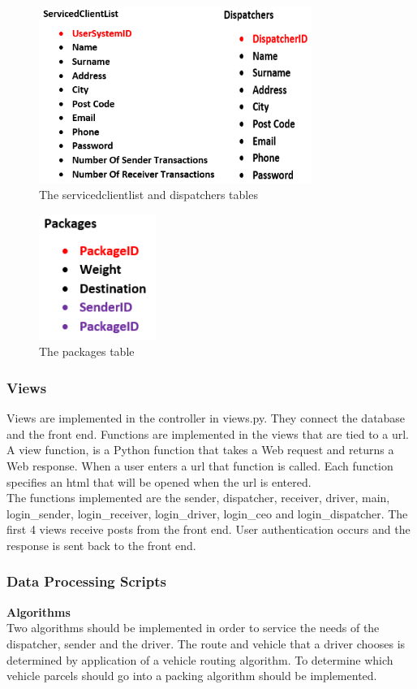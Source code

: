 \documentclass[paper=a4, fontsize=11pt]{scrartcl} %
\numberwithin{equation}{section} %
\numberwithin{figure}{section} %
\numberwithin{table}{section} %
\begin{document}
\begin{figure}[hbt!]
\centering
\includegraphics[width=3.5in]{pictures/db/second2.png}
\caption{The servicedclientlist and dispatchers tables}
\label{Second}
\end{figure}

\begin{figure}[hbt!]
\centering
\includegraphics[width=1.5in]{pictures/db/last1.png}
\caption{The packages table}
\label{Third}
\end{figure}

\subsubsection{Views}
Views are implemented in the controller in views.py. They connect the database and the front end. Functions are implemented in the views that are tied to a url. A view function, is a Python function that takes a Web request and returns a Web response. When a user enters a url that function is called. Each function specifies an html that will be opened when the url is entered. 
\\

The functions implemented are the sender, dispatcher, receiver, driver, main, login\_sender, login\_receiver, login\_driver, login\_ceo and login\_dispatcher. The first 4 views receive posts from the front end. User authentication occurs and the response is sent back to the front end. 
\\

\subsubsection{Data Processing Scripts}
\textbf{Algorithms}\\
Two algorithms should be implemented in order to service the needs of the dispatcher, sender and the driver. The route and vehicle that a driver chooses is determined by application of a vehicle routing algorithm. To determine which vehicle parcels should go into a packing algorithm should be implemented. \\ 
\end{document}

